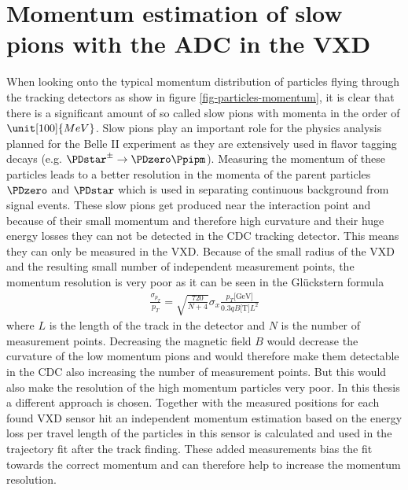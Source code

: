\newcommand{\dedx}{$\mathrm d E / \mathrm d x$ }
\chapter{Momentum estimation of slow pions with the ADC in the VXD} \label{chapter-vxd}

When looking onto the typical momentum distribution of particles flying through the tracking detectors as show in figure \ref{fig-particles-momentum}, it is clear that there is a significant amount of so called slow pions with momenta in the order of $\unit[100]{MeV}$. Slow pions play an important role for the physics analysis planned for the Belle II experiment as they are extensively used in flavor tagging decays (e.g. $\PDstar^\pm \to \PDzero \Ppipm$). Measuring the momentum of these particles leads to a better resolution in the momenta of the parent particles $\PDzero$ and $\PDstar$ which is used in separating continuous background from signal events. These slow pions get produced near the interaction point and because of their small momentum and therefore high curvature and their huge energy losses they can not be detected in the CDC tracking detector. This means they can only be measured in the VXD. Because of the small radius of the VXD and the resulting small number of independent measurement points, the momentum resolution is very poor as it can be seen in the Glückstern formula
\begin{align*}
 \frac{\sigma_{p_T}}{p_T} = \sqrt{\frac{720}{N + 4}} \sigma_x \frac{p_T \text{[GeV]}}{0.3 q B \text{[T]} L^2}
\end{align*}
where $L$ is the length of the track in the detector and $N$ is the number of measurement points. Decreasing the magnetic field $B$ would decrease the curvature of the low momentum pions and would therefore make them detectable in the CDC also increasing the number of measurement points. But this would also make the resolution of the high momentum particles very poor. In this thesis a different approach is chosen. Together with the measured positions for each found VXD sensor hit an independent momentum estimation based on the energy loss per travel length of the particles in this sensor is calculated and used in the trajectory fit after the track finding. These added measurements bias the fit towards the correct momentum and can therefore help to increase the momentum resolution.

